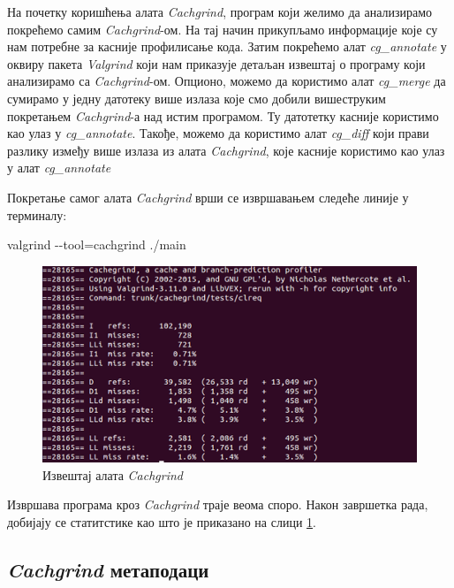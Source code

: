 \documentclass[12pt,oneside]{memoir}
\begin{document}
\indent На почетку коришћења алата \textit{Cachgrind}, програм који желимо да анализирамо покрећемо самим \textit{Cachgrind}-ом. На тај начин прикупљамо информације које су нам потребне за касније профилисање кода. Затим покрећемо алат \textit{cg\_annotate} у оквиру пакета \textit{Valgrind} који нам приказује детаљан извештај о програму који анализирамо са \textit{Cachgrind}-ом. Опционо, можемо да користимо алат \textit{cg\_merge} да сумирамо у једну датотеку више излаза које смо добили вишеструким покретањем \textit{Cachgrind}-а над истим програмом. Ту датотетку касније користимо као улаз у \textit{cg\_annotate}. Такође, можемо да користимо алат \textit{cg\_diff} који прави разлику између више излаза из алата \textit{Cachgrind}, које касније користимо као улаз у алат \textit{cg\_annotate}

\indent Покретање самог алата \textit{Cachgrind} врши се извршавањем следеће линије у терминалу:

\begin{center}
 valgrind -\--tool=cachgrind ./main
\end{center}


\begin{figure}[h!]
\begin{center}
\includegraphics[scale=0.75]{slika10.png}
\end{center}
\caption{Извештај алата \textit{Cachgrind}}
\label{fig:cachgrind}
\end{figure}

\indent Извршава програма кроз \textit{Cachgrind} траје веома споро. Након завршетка рада, добијају се статитстике као што је приказано на слици \ref{fig:cachgrind}.

\subsection{\textit{Cachgrind} метаподаци}
\end{document}
